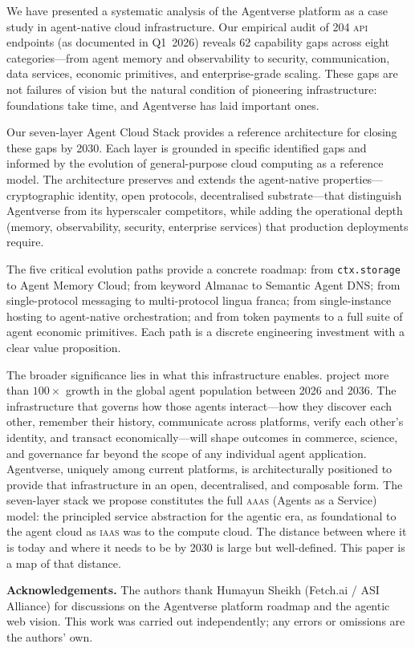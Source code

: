 \documentclass[twoside,11pt]{article}
\begin{document}
We have presented a systematic analysis of the Agentverse platform as a case
study in agent-native cloud infrastructure.  Our empirical audit of 204 \textsc{api} endpoints (as documented in Q1~2026)
reveals 62 capability gaps across eight
categories---from agent memory and observability to security, communication,
data services, economic primitives, and enterprise-grade scaling.  These gaps
are not failures of vision but the natural condition of pioneering
infrastructure: foundations take time, and Agentverse has laid important ones.

Our seven-layer Agent Cloud Stack provides a reference architecture for closing
these gaps by 2030.  Each layer is grounded in specific identified gaps and
informed by the evolution of general-purpose cloud computing as a reference
model.  The architecture preserves and extends the agent-native
properties---cryptographic identity, open protocols, decentralised
substrate---that distinguish Agentverse from its hyperscaler competitors, while
adding the operational depth (memory, observability, security, enterprise
services) that production deployments require.

The five critical evolution paths provide a concrete roadmap: from
\texttt{ctx.storage} to Agent Memory Cloud; from keyword Almanac to Semantic
Agent DNS; from single-protocol messaging to multi-protocol lingua franca; from
single-instance hosting to agent-native orchestration; and from token payments
to a full suite of agent economic primitives.  Each path is a discrete
engineering investment with a clear value proposition.

The broader significance lies in what this infrastructure enables.
\citet{hussein2025forecast} project more than $100\times$ growth in the global
agent population between 2026 and 2036.  The infrastructure that governs how
those agents interact---how they discover each other, remember their history,
communicate across platforms, verify each other's identity, and transact
economically---will shape outcomes in commerce, science, and governance far
beyond the scope of any individual agent application.  Agentverse, uniquely
among current platforms, is architecturally positioned to provide that
infrastructure in an open, decentralised, and composable form.  The seven-layer
stack we propose constitutes the full \textsc{aaas} (Agents as a Service)
model: the principled service abstraction for the agentic era, as foundational
to the agent cloud as \textsc{iaas} was to the compute cloud.  The distance
between where it is today and where it needs to be by 2030 is large but
well-defined.  This paper is a map of that distance.

\vspace{1em}
\noindent\textbf{Acknowledgements.}
The authors thank Humayun Sheikh (Fetch.ai / ASI Alliance) for discussions on
the Agentverse platform roadmap and the agentic web vision.  This work was
carried out independently; any errors or omissions are the authors' own.



\end{document}

